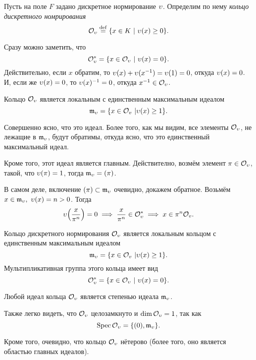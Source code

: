 	\begin{definition} 
		Пусть на поле $F$ задано дискретное нормирование $\upsilon$. Определим по нему \emph{кольцо дискретного номрирования}
		\[
			\mathcal{O}_{\upsilon} \stackrel{\mathrm{def}}{=} \{ x \in K \ \vert \ \upsilon(x) \ge 0 \}.
		\]
	\end{definition}

	Сразу можно заметить, что 
	\[
		\mathcal{O}_{\upsilon}^{*} = \{ x \in \mathcal{O}_{\upsilon} \ \vert \ \upsilon(x) = 0 \}.
	\]
	Действительно, если $x$ обратим, то $\upsilon(x) + \upsilon(x^{-1}) = \upsilon(1) = 0$, откуда $\upsilon(x) = 0$. И, если же $\upsilon(x) = 0$, то $\upsilon(x)^{-1} = 0$, откуда $x^{-1} \in \mathcal{O}_{\upsilon}$. 

	Кольцо $\mathcal{O}_{\upsilon}$ является локальным с единственным максимальным идеалом 
	\[
		\mathfrak{m}_{\upsilon} = \{ x \in \mathcal{O}_{v} \ \vert \upsilon(x) \ge 1 \}.
	\]

	Совершенно ясно, что это идеал. Более того, как мы видим, все элементы $\mathcal{O}_{\upsilon}$, не лежащие в $\mathfrak{m}_{\upsilon}$, будут обратимы, откуда ясно, что это единственный максимальный идеал. 

	Кроме того, этот идеал является главным. Действително, возмём элемент $\pi \in \mathcal{O}_{\upsilon}$, такой, что $\upsilon(\pi) = 1$, тогда $\mathfrak{m}_{\upsilon} = (\pi)$. 

	В самом деле, включение $(\pi) \subset \mathfrak{m}_{\upsilon}$ очевидно, докажем обратное. Возьмём $x \in \mathfrak{m}_{\upsilon}, \ \upsilon(x) = n > 0$.  Тогда 
	\[
		\v\lr*{\frac{x}{\pi^n}} = 0 \implies \frac{x}{\pi^n} \in \cO_{\v}^{*} \implies x \in \pi^n\cO_{v}.
	\]

	\begin{statement} 
		Кольцо дискретного нормирования $\mathcal{O}_{\upsilon}$ является локальным кольцом с единственным максимальным идеалом 
		\[
			\mathfrak{m}_{\upsilon} = \{ x \in \mathcal{O}_{v} \ \vert \upsilon(x) \ge 1 \}.
		\]	
		Мультипликативная группа этого кольца имеет вид 
		\[
			\mathcal{O}_{\upsilon}^{*} = \{ x \in \mathcal{O}_{\upsilon} \ \vert \ \upsilon(x) = 0 \}.
		\]	

	\end{statement}

	\begin{exercise}
		Любой идеал кольца $\mathcal{O}_{\upsilon}$ является степенью идеала $\mathfrak{m}_{\upsilon}$.
	\end{exercise}

	Также легко видеть, что $\mathcal{O}_{\upsilon}$ целозамкнуто и $\dim{\mathcal{O}_{\upsilon}} = 1$, так как 
	\[
	  	\operatorname{Spec}{\mathcal{O}_{\upsilon}} = \{ (0), \mathfrak{m}_{\upsilon} \}.
	  \]  

	Кроме того, очевидно, что кольцо $\mathcal{O}_{\upsilon}$ нётерово (более того, оно является областью главных идеалов). 



